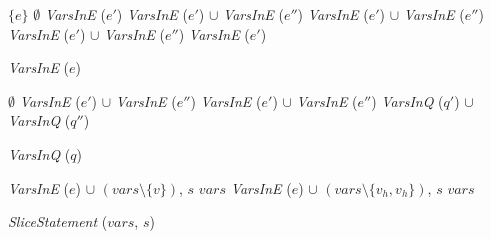 
\begin{algorithm}
  \begin{algorithmic}[1]
        \Return $\{ e \}$
      \EndCase
        \Return $\emptyset$
      \EndCase
        \Return \textit{VarsInE} ($e'$)
      \EndCase
        \Return \textit{VarsInE} ($e'$) $\cup$ \textit{VarsInE} ($e''$)
      \EndCase
        \Return \textit{VarsInE} ($e'$) $\cup$ \textit{VarsInE} ($e''$)
      \EndCase
        \Return \textit{VarsInE} ($e'$) $\cup$ \textit{VarsInE} ($e''$)
      \EndCase
        \Return \textit{VarsInE} ($e'$)
      \EndCase
    \EndMatch
  \end{algorithmic}
  \caption{\textit{VarsInE} ($e$)}
\end{algorithm}

\begin{algorithm}
\begin{algorithmic}[1]
    \Case{$\top$}
      $\emptyset$
    \EndCase
      \Return \textit{VarsInE} ($e'$) $\cup$ \textit{VarsInE} ($e''$)
    \EndCase
      \Return \textit{VarsInE} ($e'$) $\cup$ \textit{VarsInE} ($e''$)
    \EndCase
      \Return \textit{VarsInQ} ($q'$) $\cup$ \textit{VarsInQ} ($q''$)
    \EndCase
  \EndMatch
\end{algorithmic}
\caption{\textit{VarsInQ} ($q$)}
\end{algorithm}

\begin{algorithm}
  \begin{algorithmic}[1]
          {\Return \textit{VarsInE} ($e$) $\cup$ $(\mathit{vars} \setminus \{
            v \})$, $s$}
          {\Return $\mathit{vars}$}
      \EndCase
          {\Return \textit{VarsInE} ($e$) $\cup$ $(\mathit{vars} \setminus \{
            v_h, v_h \})$, $s$}
          {\Return $\mathit{vars}$}
      \EndCase
    \EndMatch
  \end{algorithmic}
  \caption{\textit{SliceStatement} ($\mathit{vars}$, $s$)}
\end{algorithm}

